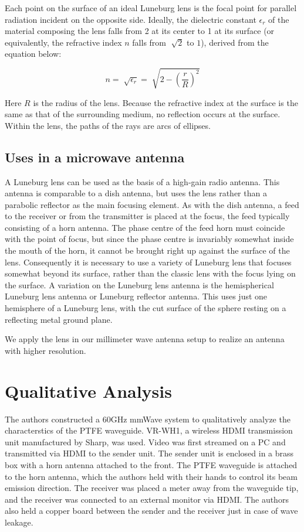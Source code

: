\documentclass[a4paper,12pt]{report}
\begin{document}
Each point on the surface of an ideal Luneburg lens is the
focal point for parallel radiation incident on the opposite side.
Ideally, the dielectric constant $\epsilon_r$ of the material
composing the lens falls from 2 at its center to 1 at its surface
(or equivalently, the refractive index $n$ falls from $\sqrt[]{2}$ to $1$),
derived from the equation below:

\begin{equation}
  n = \sqrt[]{\epsilon_r} = \sqrt[]{2 - \left(\frac{r}{R}\right)^2}
\end{equation}

Here $R$ is the radius of the lens.
Because the refractive index at the surface is the same
as that of the surrounding medium,
no reflection occurs at the surface.
Within the lens, the paths of the rays are arcs of ellipses.

\subsection{Uses in a microwave antenna}

A Luneburg lens can be used as the basis of a high-gain radio antenna.
This antenna is comparable to a dish antenna,
but uses the lens rather than a parabolic reflector as the main focusing element.
As with the dish antenna,
a feed to the receiver or from the transmitter is placed at the focus,
the feed typically consisting of a horn antenna.
The phase centre of the feed horn must coincide with the point of focus,
but since the phase centre is invariably somewhat inside the mouth of the horn,
it cannot be brought right up against the surface of the lens.
Consequently it is necessary to use a variety of Luneburg lens
that focuses somewhat beyond its surface,
rather than the classic lens with the focus lying on the surface.
A variation on the Luneburg lens antenna is the hemispherical
Luneburg lens antenna or Luneburg reflector antenna.
This uses just one hemisphere of a Luneburg lens,
with the cut surface of the sphere resting on a reflecting metal ground plane.

We apply the lens in our millimeter wave antenna setup to
realize an antenna with higher resolution.

\section{Qualitative Analysis}

The authors constructed a 60GHz mmWave system to
qualitatively analyze the characterstics of the PTFE waveguide.
VR-WH1, a wireless HDMI transmission unit manufactured by Sharp, was used.
Video was first streamed on a PC and transmitted via HDMI to the sender unit.
The sender unit is enclosed in a brass box with a horn antenna attached to the front.
The PTFE waveguide is attached to the horn antenna,
which the authors held with their hands to control
its beam emission direction.
The receiver was placed a meter away from the waveguide tip,
and the receiver was connected to an external monitor via HDMI.
The authors also held a copper board between the sender and the receiver
just in case of wave leakage.
\end{document}
